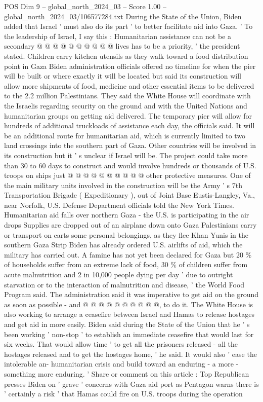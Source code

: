\begin{textsample}{POS Dim 9 – global\_north\_2024\_03 – Score 1.00 – global\_north\_2024\_03/106577284.txt}
During the State of the Union, Biden added that Israel ' must also do its part ' to better facilitate aid into Gaza. ' To the leadership of Israel, I say this : Humanitarian assistance can not be a secondary @ @ @ @ @ @ @ @ @ @ lives has to be a priority, ' the president stated.
Children carry kitchen utensils as they walk toward a food distribution point in Gaza Biden administration officials offered no timeline for when the pier will be built or where exactly it will be located but said its construction will allow more shipments of food, medicine and other essential items to be delivered to the 2.2 million Palestinians.
They said the White House will coordinate with the Israelis regarding security on the ground and with the United Nations and humanitarian groups on getting aid delivered.
The temporary pier will allow for hundreds of additional truckloads of assistance each day, the officials said.
It will be an additional route for humanitarian aid, which is currently limited to two land crossings into the southern part of Gaza.
Other countries will be involved in its construction but it ' s unclear if Israel will be.
The project could take more than 30 to 60 days to construct and would involve hundreds or thousands of U.S. troops on ships just @ @ @ @ @ @ @ @ @ @ other protective measures.
One of the main military units involved in the construction will be the Army ' s 7th Transportation Brigade ( Expeditionary ), out of Joint Base Eustis-Langley, Va., near Norfolk, U.S.
Defense Department officials told the New York Times.
Humanitarian aid falls over northern Gaza - the U.S. is participating in the air drops Supplies are dropped out of an airplane down onto Gaza Palestinians carry or transport on carts some personal belongings, as they flee Khan Yunis in the southern Gaza Strip Biden has already ordered U.S. airlifts of aid, which the military has carried out.
A famine has not yet been declared for Gaza but 20 \% of households suffer from an extreme lack of food, 30 \% of children suffer from acute malnutrition and 2 in 10,000 people dying per day ' due to outright starvation or to the interaction of malnutrition and disease, ' the World Food Program said.
The administration said it was imperative to get aid on the ground as soon as possible - and @ @ @ @ @ @ @ @ @ @, to do it.
The White House is also working to arrange a ceasefire between Israel and Hamas to release hostages and get aid in more easily.
Biden said during the State of the Union that he ' s been working ' non-stop ' to establish an immediate ceasefire that would last for six weeks.
That would allow time ' to get all the prisoners released - all the hostages released and to get the hostages home, ' he said.
It would also ' ease the intolerable an- humanitarian crisis and build toward an enduring - a more - something more enduring. ' Share or comment on this article : Top Republican presses Biden on ' grave ' concerns with Gaza aid port as Pentagon warns there is ' certainly a risk ' that Hamas could fire on U.S. troops during the operation

\end{textsample}
